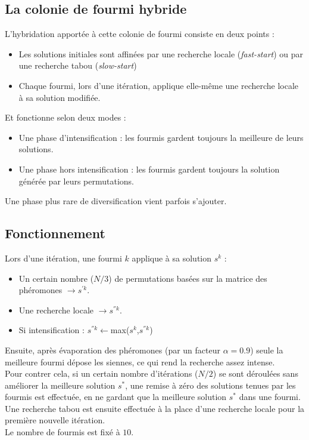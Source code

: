 \documentclass[b]{beamer}
\begin{document}
\subsection{La colonie de fourmi hybride}
\begin{frame}
L'hybridation apportée à cette colonie de fourmi consiste en deux points :\\
	\begin{itemize}
	\item Les solutions initiales sont affinées par une recherche locale (\emph{fast-start}) ou par une recherche tabou (\emph{slow-start})\\
	\item Chaque fourmi, lors d'une itération, applique elle-même une recherche locale à sa solution modifiée.\\
	\end{itemize}
Et fonctionne selon deux modes :
	\begin{itemize}
	\item Une phase d'intensification : les fourmis gardent toujours la meilleure de leurs solutions.
	\item Une phase hors intensification : les fourmis gardent toujours la solution générée par leurs permutations.\\[.5cm]
	\end{itemize}
Une phase plus rare de diversification vient parfois s'ajouter.
\end{frame}

\subsection{Fonctionnement}
\begin{frame}
Lors d'une itération, une fourmi $k$ applique à sa solution $s^k$ :
\begin{itemize}
	\item Un certain nombre ($N/3$) de permutations basées sur la matrice des phéromones $\rightarrow s^{'k}$.
	\item Une recherche locale $\rightarrow s^{''k}$.
	\item Si intensification : $s^{''k}\leftarrow$max($s^k$,$s^{''k}$)
\end{itemize}
Ensuite, après évaporation des phéromones (par un facteur $\alpha=0.9$) seule la meilleure fourmi dépose les siennes, ce qui rend la recherche assez intense.\\
Pour contrer cela, si un certain nombre d'itérations ($N/2$) se sont déroulées sans améliorer la meilleure solution $s^*$, une remise à zéro des solutions tenues par les fourmis est effectuée, en ne gardant que la meilleure solution $s^*$ dans une fourmi. Une recherche tabou est ensuite effectuée à la place d'une recherche locale pour la première nouvelle itération.\\[.5cm]
Le nombre de fourmis est fixé à $10$.
\end{frame}
\end{document}
